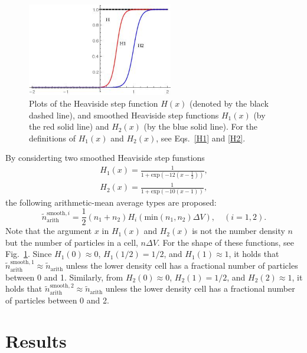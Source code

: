 \documentclass{article}
\begin{document}
\begin{figure}[t]
\centering
\includegraphics[width=2.5in]{fig2/heaviside.jpg}
\caption{\label{fig_heaviside}Plots of the Heaviside step function $H(x)$ (denoted by the black dashed line), and smoothed Heaviside step functions $H_1(x)$ (by the red solid line) and $H_2(x)$ (by the blue solid line). For the definitions of $H_1(x)$ and $H_2(x)$, see Eqs.~\eqref{H1} and \eqref{H2}.}
\end{figure}

By considerting two smoothed Heaviside step funstions
\begin{align}
\label{H1}
H_1(x)=\frac{1}{1+\mathrm{exp}(-12(x-\frac{1}{2}))},\\
\label{H2}
H_2(x)=\frac{1}{1+\mathrm{exp}(-10(x-1))},
\end{align}
the following arithmetic-mean average types are proposed:
\begin{equation}
\tilde{n}_\mathrm{arith}^{\mathrm{smooth},i} = \frac{1}{2}(n_1+n_2)H_i(\mathrm{min}(n_1,n_2)\Delta V),\quad (i=1,2).
\end{equation}
Note that the argument $x$ in $H_1(x)$ and $H_2(x)$ is not the number density $n$ but the number of particles in a cell, $n\Delta V$.
For the shape of these functions, see Fig.~\ref{fig_heaviside}.
Since $H_1(0)\approx 0$, $H_1(1/2)=1/2$, and $H_1(1)\approx 1$, it holds that $\tilde{n}_\mathrm{arith}^{\mathrm{smooth},1}\approx \tilde{n}_\mathrm{arith}$ unless the lower density cell has a fractional number of particles between 0 and 1.   
Similarly, from $H_2(0)\approx 0$, $H_2(1)=1/2$, and $H_2(2)\approx 1$, it holds that $\tilde{n}_\mathrm{arith}^{\mathrm{smooth},2}\approx \tilde{n}_\mathrm{arith}$ unless the lower density cell has a fractional number of particles between 0 and 2.   

\section{Results}
\end{document}
